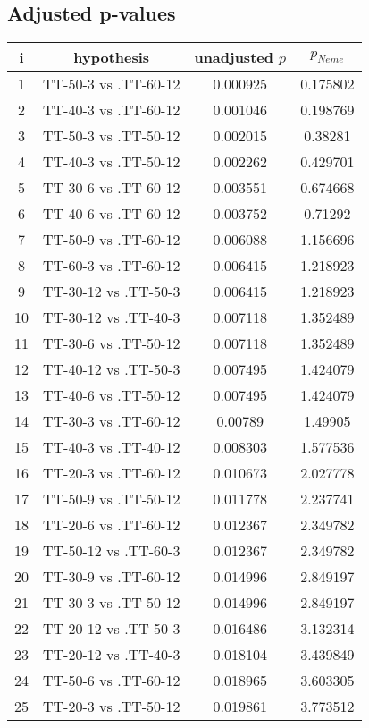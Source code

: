 \documentclass[a4paper,10pt]{article}
\begin{document}
\begin{landscape}
\pagebreak

\subsection{Adjusted p-values}

\begin{table}[!htp]
\centering\scriptsize
\begin{tabular}{cccc}
i&hypothesis&unadjusted $p$&$p_{Neme}$\\
\hline1&TT-50-3 vs .TT-60-12&0.000925&0.175802\\
2&TT-40-3 vs .TT-60-12&0.001046&0.198769\\
3&TT-50-3 vs .TT-50-12&0.002015&0.38281\\
4&TT-40-3 vs .TT-50-12&0.002262&0.429701\\
5&TT-30-6 vs .TT-60-12&0.003551&0.674668\\
6&TT-40-6 vs .TT-60-12&0.003752&0.71292\\
7&TT-50-9 vs .TT-60-12&0.006088&1.156696\\
8&TT-60-3 vs .TT-60-12&0.006415&1.218923\\
9&TT-30-12 vs .TT-50-3&0.006415&1.218923\\
10&TT-30-12 vs .TT-40-3&0.007118&1.352489\\
11&TT-30-6 vs .TT-50-12&0.007118&1.352489\\
12&TT-40-12 vs .TT-50-3&0.007495&1.424079\\
13&TT-40-6 vs .TT-50-12&0.007495&1.424079\\
14&TT-30-3 vs .TT-60-12&0.00789&1.49905\\
15&TT-40-3 vs .TT-40-12&0.008303&1.577536\\
16&TT-20-3 vs .TT-60-12&0.010673&2.027778\\
17&TT-50-9 vs .TT-50-12&0.011778&2.237741\\
18&TT-20-6 vs .TT-60-12&0.012367&2.349782\\
19&TT-50-12 vs .TT-60-3&0.012367&2.349782\\
20&TT-30-9 vs .TT-60-12&0.014996&2.849197\\
21&TT-30-3 vs .TT-50-12&0.014996&2.849197\\
22&TT-20-12 vs .TT-50-3&0.016486&3.132314\\
23&TT-20-12 vs .TT-40-3&0.018104&3.439849\\
24&TT-50-6 vs .TT-60-12&0.018965&3.603305\\
25&TT-20-3 vs .TT-50-12&0.019861&3.773512\\

\end{tabular}
\end{table}
\end{landscape}
\end{document}
